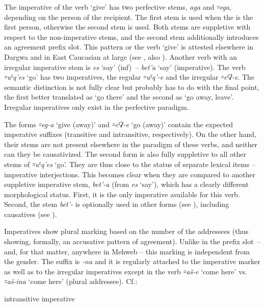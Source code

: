 \documentclass[output=paper]{langsci/langscibook}
\begin{document}
The imperative of the verb `give' has two perfective stems, \emph{aga}
and \emph{꞊ega}, depending on the person of the recipient. The first
stem is used when the  is the first person, otherwise the
second stem is used. Both stems are suppletive with respect to the
non-imperative stems, and the second stem additionally introduces an
agreement prefix slot. This pattern or the verb `give' is attested
elsewhere in Dargwa and in East Caucasian at large (see \citealt{comrie2003},
also \citealt{daniel-etal2010}). Another verb with an irregular imperative stem
is \emph{es} `say' (inf)~– \emph{bet'a} `say' (imperative). The verb
 \emph{꞊uˤq'es} `go' has two imperatives, the regular \mbox{\emph{꞊uˤq'-e}} and
the irregular \emph{꞊eˤʡ-e}. The semantic distinction is not fully clear
but probably has to do with the final point, the first better translated
as `go there' and the second as `go away, leave'. Irregular imperatives
only exist in the perfective paradigm.

The forms \emph{꞊eg-a} `give (away)' and \emph{꞊eˤʡ-e} `go (away)'
contain the expected imperative suffixes (transitive and intransitive,
respectively). On the other hand, their stems are not present elsewhere
in the paradigm of these verbs, and neither can they be causativized. The
second form is also fully suppletive to all other stems of
\emph{꞊uˤq'es} `go'. They are thus close to the status of separate
lexical items – imperative interjections. This becomes clear when they
are compared to another suppletive imperative stem, \emph{bet'-a} (from
\emph{es} `say'), which has a clearly different morphological status.
First, it is the only imperative available for this verb. Second, the stem \emph{bet'-} is
optionally used in other forms (see ), including causatives (see ).

Imperatives show plural marking based on the number of the addressees
(thus showing, formally, an accusative pattern of agreement). Unlike in
the prefix slot~– and, for that matter, anywhere in Mehweb – this
marking is independent from the gender. The suffix is \emph{-na} and it
is regularly attached to the imperative marker as well as to the
irregular imperatives except in the verb \emph{꞊aš-e} `come here' vs.
\emph{꞊aš-ina} `come here' (plural addressee). Cf.:

\ea %
intransitive imperative

\ea {}%
\exsameline
{}
\z
\end{document}
